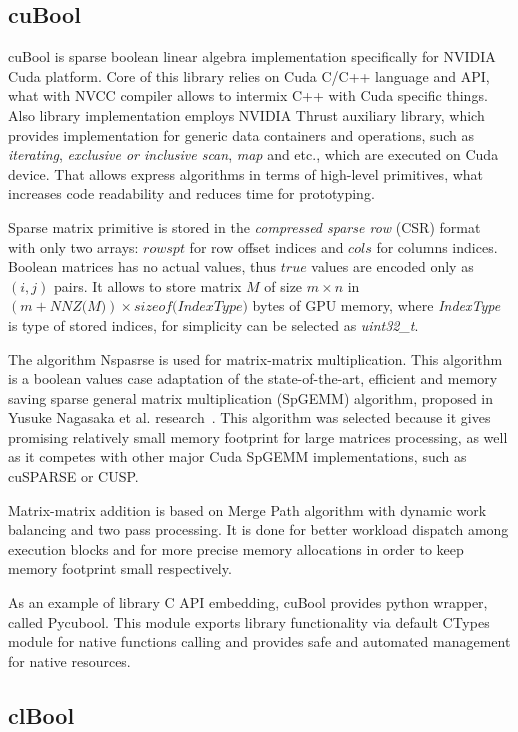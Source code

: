 \subsection{cuBool}

cuBool is sparse boolean linear algebra implementation specifically for NVIDIA Cuda platform. Core of this 
library relies on Cuda C/C++ language and API, what with NVCC compiler allows to intermix C++ with Cuda 
specific things. Also library implementation employs NVIDIA Thrust auxiliary library, which provides 
implementation for generic data containers and operations, such as \textit{iterating}, \textit{exclusive or 
inclusive scan}, \textit{map} and etc., which are executed on Cuda device. That allows express algorithms in 
terms of high-level primitives, what increases code readability and reduces time for prototyping.

Sparse matrix primitive is stored in the \textit{compressed sparse row} (CSR) format with only two arrays: 
$rowspt$ for row offset indices and $cols$ for columns indices. Boolean matrices has no actual values, thus 
$true$ values are encoded only as $(i, j)$ pairs. It allows to store matrix $M$ of size $m \times n$ 
in $(m + \textit{NNZ(M)}) \times \textit{sizeof(IndexType)}$ bytes of GPU memory, where 
\textit{IndexType} is type of stored indices, for simplicity can be selected as \textit{uint32\_t}.

The algorithm Nspasrse is used for matrix-matrix multiplication. This algorithm is a boolean values case 
adaptation of the state-of-the-art, efficient and memory saving sparse general matrix multiplication (SpGEMM) 
algorithm, proposed in Yusuke Nagasaka et al. research~\cite{todo}. This algorithm was selected because it 
gives promising relatively small memory footprint for large matrices processing, as well as it competes with 
other major Cuda SpGEMM implementations, such as cuSPARSE or CUSP.  

Matrix-matrix addition is based on Merge Path algorithm with dynamic work balancing and two pass processing. 
It is done for better workload dispatch among execution blocks and for more precise memory allocations in
order to keep memory footprint small respectively. 

As an example of library C API embedding, cuBool provides python wrapper, called Pycubool. This module exports 
library functionality via default CTypes module for native functions calling and provides safe and automated 
management for native resources. 

\subsection{clBool}

